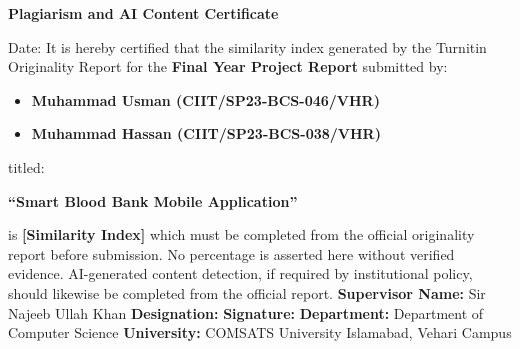 \newpage
\thispagestyle{empty}
\begin{center}
\textbf{\LARGE Plagiarism and AI Content Certificate}
\end{center}
\vspace{1cm}
\noindent Date: \underline{\hspace{4cm}}
\vspace{1cm}
\noindent It is hereby certified that the similarity index generated by the Turnitin Originality Report for the \textbf{Final Year Project Report} submitted by:
\begin{itemize}
    \item \textbf{Muhammad Usman (CIIT/SP23-BCS-046/VHR)}
    \item \textbf{Muhammad Hassan (CIIT/SP23-BCS-038/VHR)}
\end{itemize}
\noindent titled:
\begin{center}
\textbf{``Smart Blood Bank Mobile Application''}
\end{center}
\noindent is \textbf{[Similarity Index]} which must be completed from the official originality report before submission. No percentage is asserted here without verified evidence.
\vspace{0.5cm}
\noindent AI-generated content detection, if required by institutional policy, should likewise be completed from the official report.
\vspace{2cm}
\noindent \textbf{Supervisor Name:} Sir Najeeb Ullah Khan
\vspace{0.5cm}
\noindent \textbf{Designation:} \underline{\hspace{6cm}}
\vspace{0.5cm}
\noindent \textbf{Signature:} \underline{\hspace{6cm}}
\vspace{0.5cm}
\noindent \textbf{Department:} Department of Computer Science
\vspace{0.5cm}
\noindent \textbf{University:} COMSATS University Islamabad, Vehari Campus
